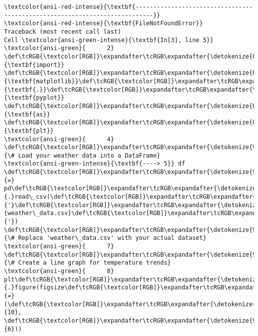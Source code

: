\documentclass[11pt]{article}
\begin{document}
    \begin{Verbatim}[commandchars=\\\{\}, frame=single, framerule=2mm, rulecolor=\color{outerrorbackground}]
\textcolor{ansi-red-intense}{\textbf{---------------------------------------------------------------------------}}
\textcolor{ansi-red-intense}{\textbf{FileNotFoundError}}                         Traceback (most recent call last)
Cell \textcolor{ansi-green-intense}{\textbf{In[3], line 5}}
\textcolor{ansi-green}{      2} \def\tcRGB{\textcolor[RGB]}\expandafter\tcRGB\expandafter{\detokenize{0,135,0}}{\textbf{import}} \def\tcRGB{\textcolor[RGB]}\expandafter\tcRGB\expandafter{\detokenize{0,0,255}}{\textbf{matplotlib}}\def\tcRGB{\textcolor[RGB]}\expandafter\tcRGB\expandafter{\detokenize{0,0,255}}{\textbf{.}}\def\tcRGB{\textcolor[RGB]}\expandafter\tcRGB\expandafter{\detokenize{0,0,255}}{\textbf{pyplot}} \def\tcRGB{\textcolor[RGB]}\expandafter\tcRGB\expandafter{\detokenize{0,135,0}}{\textbf{as}} \def\tcRGB{\textcolor[RGB]}\expandafter\tcRGB\expandafter{\detokenize{0,0,255}}{\textbf{plt}}
\textcolor{ansi-green}{      4} \def\tcRGB{\textcolor[RGB]}\expandafter\tcRGB\expandafter{\detokenize{95,135,135}}{\# Load your weather data into a DataFrame}
\textcolor{ansi-green-intense}{\textbf{----> 5}} df \def\tcRGB{\textcolor[RGB]}\expandafter\tcRGB\expandafter{\detokenize{98,98,98}}{=} pd\def\tcRGB{\textcolor[RGB]}\expandafter\tcRGB\expandafter{\detokenize{98,98,98}}{.}read\_csv(\def\tcRGB{\textcolor[RGB]}\expandafter\tcRGB\expandafter{\detokenize{175,0,0}}{'}\def\tcRGB{\textcolor[RGB]}\expandafter\tcRGB\expandafter{\detokenize{175,0,0}}{weather\_data.csv}\def\tcRGB{\textcolor[RGB]}\expandafter\tcRGB\expandafter{\detokenize{175,0,0}}{'})  \def\tcRGB{\textcolor[RGB]}\expandafter\tcRGB\expandafter{\detokenize{95,135,135}}{\# Replace 'weather\_data.csv' with your actual dataset}
\textcolor{ansi-green}{      7} \def\tcRGB{\textcolor[RGB]}\expandafter\tcRGB\expandafter{\detokenize{95,135,135}}{\# Create a line graph for temperature trends}
\textcolor{ansi-green}{      8} plt\def\tcRGB{\textcolor[RGB]}\expandafter\tcRGB\expandafter{\detokenize{98,98,98}}{.}figure(figsize\def\tcRGB{\textcolor[RGB]}\expandafter\tcRGB\expandafter{\detokenize{98,98,98}}{=}(\def\tcRGB{\textcolor[RGB]}\expandafter\tcRGB\expandafter{\detokenize{98,98,98}}{10}, \def\tcRGB{\textcolor[RGB]}\expandafter\tcRGB\expandafter{\detokenize{98,98,98}}{6}))


\end{Verbatim}
\end{document}
